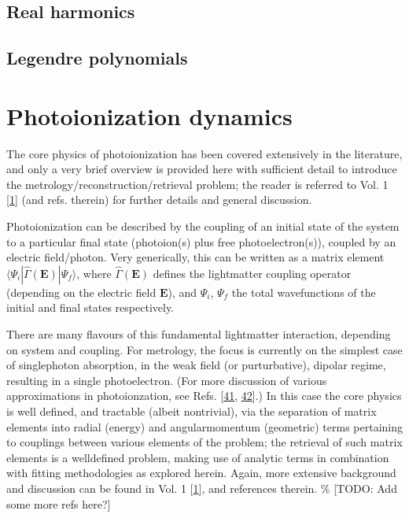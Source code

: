\documentclass[letterpaper,table,10pt,english]{jupyterBook}
\begin{document}
\subsection{Real harmonics}
\label{\detokenize{part1/theory_observables_intro_211122:real-harmonics}}

\subsection{Legendre polynomials}
\label{\detokenize{part1/theory_observables_intro_211122:legendre-polynomials}}
\sphinxstepscope


\section{Photoionization dynamics}
\label{\detokenize{part1/theory_photoionization_dynamics_191122:photoionization-dynamics}}\label{\detokenize{part1/theory_photoionization_dynamics_191122:sec-dynamics-intro}}\label{\detokenize{part1/theory_photoionization_dynamics_191122::doc}}
\sphinxAtStartPar
The core physics of photoionization has been covered extensively in the literature, and only a very brief overview is provided here with sufficient detail to introduce the metrology/reconstruction/retrieval problem; the reader is referred to Vol. 1 {[}\hyperlink{cite.backmatter/bibliography:id569}{1}{]} (and refs. therein) for further details and general discussion.

\sphinxAtStartPar
Photoionization can be described by the coupling of an initial state of the system to a particular final state (photoion(s) plus free photoelectron(s)), coupled by an electric field/photon. Very generically, this can be written as a matrix element \(\langle\Psi_i|\hat{\Gamma}(\boldsymbol{\mathbf{E}})|\Psi_f\rangle\), where \(\hat{\Gamma}(\boldsymbol{\mathbf{E}})\) defines the light\sphinxhyphen{}matter coupling operator (depending on the electric field \(\boldsymbol{\mathbf{E}}\)), and \(\Psi_i\), \(\Psi_f\) the total wavefunctions of the initial and final states respectively.

\sphinxAtStartPar
There are many flavours of this fundamental light\sphinxhyphen{}matter interaction, depending on system and coupling. For metrology, the focus is currently on the simplest case of single\sphinxhyphen{}photon absorption, in the weak field (or purturbative), dipolar regime, resulting in a single photoelectron. (For more discussion of various approximations in photoionzation, see Refs. {[}\hyperlink{cite.backmatter/bibliography:id736}{41}, \hyperlink{cite.backmatter/bibliography:id735}{42}{]}.) In this case the core physics is well defined, and tractable (albeit non\sphinxhyphen{}trivial), via the separation of matrix elements into radial (energy) and angular\sphinxhyphen{}momentum (geometric) terms pertaining to couplings between various elements of the problem; the retrieval of such matrix elements is a well\sphinxhyphen{}defined problem, making use of analytic terms in combination with fitting methodologies as explored herein. Again, more extensive background and discussion can be found in  Vol. 1 {[}\hyperlink{cite.backmatter/bibliography:id569}{1}{]}, and references therein. \% {[}TODO: Add some more refs here?{]}
\end{document}
